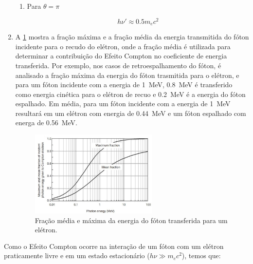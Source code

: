 \documentclass[11pt,a4paper]{article}
\newcounter{exemplo}
\begin{document}
\begin{enumerate}
\begin{enumerate}
				\item Para $\theta = \pi$
				
					\begin{equation}
						h\nu' \approx 0.5 m_ec^2
					\end{equation}
			\end{enumerate}

		\item A \ref{fig:maximoEMediaFracaoEletronCompton} mostra a fração máxima e a fração média da energia transmitida do fóton incidente para o recudo do elétron, onde a fração média é utilizada para determinar a contribuição do Efeito Compton no coeficiente de energia transferida. Por exemplo, nos casos de retroespalhamento do fóton, é analisado a fração máxima da energia do fóton trasmitida para o elétron, e para um fóton incidente com a energia de \qty{1}{MeV}, \qty{0.8}{MeV} é transferido como energia cinética para o elétron de recuo e \qty{0.2}{MeV} é a energia do fóton espalhado. Em média, para um fóton incidente com a energia de \qty{1}{MeV} resultará em um elétron com energia de \qty{0.44}{MeV} e um fóton espalhado com energa de \qty{0.56}{MeV}.
		
			\begin{figure}[h]
				\centering
				\includegraphics[width=0.6\textwidth]{Imagens/maximoEMediaFracaoEletronCompton.JPG}
				\caption{Fração média e máxima da energia do fóton transferida para um elétron.}
				\label{fig:maximoEMediaFracaoEletronCompton}
			\end{figure}
	\end{enumerate}

    Como o Efeito Compton ocorre na interação de um fóton com um elétron praticamente livre e em um estado estacionário ($h\nu \gg m_e c^2$), temos que:
\end{document}
